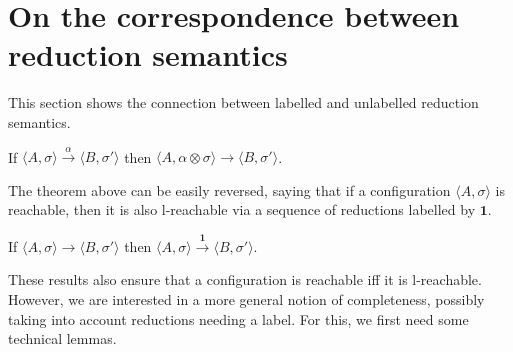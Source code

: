 \documentclass{llncs}
\def\C{{\mathcal C}}
\newcommand{\comment}[1]{}
\def\monid{{\mathbf 0}}
\def\C{{\mathcal C}}
\def\odiv{\, {\ominus\hspace{-7.7pt} \div} \,}
\def\monid{\mathbf{1}}
\begin{document}
\section{On the correspondence between reduction semantics}
\label{corres}
This section shows the connection between labelled and unlabelled reduction semantics.
%

\begin{theorem}[Soundness]
\label{sound}
If $\langle A, \sigma \rangle \xrightarrow{\alpha} \langle B, \sigma' \rangle$
then %
$\langle A, \alpha \otimes \sigma \rangle \to \langle B, \sigma' \rangle$.
\end{theorem}



The theorem above can be easily reversed, saying that if a configuration $\langle A, \sigma \rangle$ is reachable,
then it is also l-reachable via a sequence of reductions labelled by $\monid$.

\begin{lemma}
\label{idred}
If %
$\langle A, \sigma \rangle \to \langle B, \sigma' \rangle$
then %
$\langle A, \sigma \rangle \xrightarrow{\monid}  \langle B, \sigma' \rangle$.
\end{lemma}

	
These results also ensure that a configuration is reachable iff it is l-reachable.
%
However, we are interested in a more general notion of completeness, possibly taking into account 
reductions needing a label. For this, we first need some technical lemmas.
%
\comment{
\begin{lemma}
\label{minor}
Let $\langle A, \tau \rangle$ be a reachable configuration such that
$\sigma \leq \tau$. If $\C$ is invertible then $\langle A, \sigma \rangle$ is a reachable configuration.
%
Moreover, if  $\langle A, \tau \rangle \to \langle B, \tau' \rangle$ then
$\langle A, \sigma \rangle \to \langle B', \sigma' \rangle$ 
with $\sigma' = \tau' \otimes (\sigma \odiv \tau)$.
Furthermore, if $\C$ is also cancellative then $B = B'$.
\end{lemma}
}
%
\end{document}
